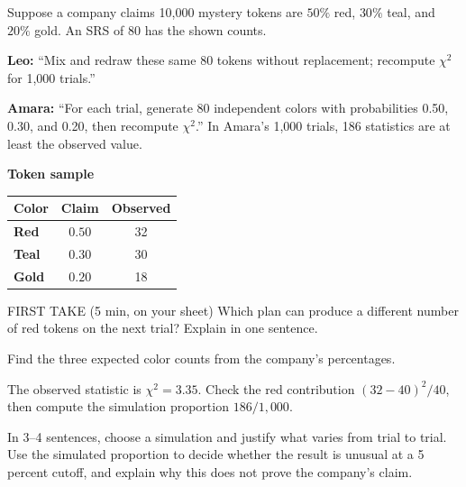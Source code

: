 \documentclass[14pt]{extarticle}
\begin{document}
\pagestyle{empty}


\noindent\begin{minipage}[t]{0.57\linewidth}
\vspace{0pt}
Suppose a company claims 10{,}000 mystery tokens are $50\%$ red, $30\%$ teal, and $20\%$ gold. An SRS of 80 has the shown counts.\par\smallskip \textbf{Leo:} ``Mix and redraw these same 80 tokens without replacement; recompute $\chi^2$ for 1,000 trials.''\par \textbf{Amara:} ``For each trial, generate 80 independent colors with probabilities 0.50, 0.30, and 0.20, then recompute $\chi^2$.'' In Amara's 1,000 trials, 186 statistics are at least the observed value.\par
\end{minipage}\hfill
\begin{minipage}[t]{0.40\linewidth}
\vspace{0pt}
\begin{center}
\textbf{Token sample}\par\smallskip
\begin{tabular}{|l|c|c|}
\hline
\textbf{Color} & \textbf{Claim} & \textbf{Observed} \\ \hline
\textbf{Red} & $0.50$ & 32 \\ \hline
\textbf{Teal} & $0.30$ & 30 \\ \hline
\textbf{Gold} & $0.20$ & 18 \\ \hline
\end{tabular}
\end{center}
\end{minipage}

\begin{firsttakebox}{FIRST TAKE (5 min, on your sheet)}
Which plan can produce a different number of red tokens on the next trial? Explain in one sentence.
\end{firsttakebox}

\begin{description}[leftmargin=1.15in, labelwidth=1in, itemsep=2pt, topsep=2pt]
  \item[\dokbadge{1}~(a)] Find the three expected color counts from the company's percentages.
  \item[\dokbadge{2}~(b)] The observed statistic is $\chi^2=3.35$. Check the red contribution $(32-40)^2/40$, then compute the simulation proportion $186/1{,}000$.
  \item[\dokbadge{3}~(c)] In 3--4 sentences, choose a simulation and justify what varies from trial to trial. Use the simulated proportion to decide whether the result is unusual at a 5 percent cutoff, and explain why this does not prove the company's claim.
\end{description}
\end{document}
